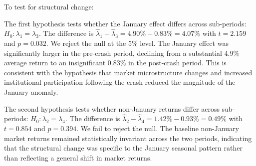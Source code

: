 \documentclass[11pt, a4paper]{article}
\begin{document}
To test for structural change:

The first hypothesis tests whether the January effect differs across sub-periods: \(H_0\colon \lambda_1 = \lambda_3\). The difference is \(\hat{\lambda}_1 - \hat{\lambda}_3 = 4.90\% - 0.83\% = 4.07\%\) with \(t = 2.159\) and \(p = 0.032\). We reject the null at the 5\% level. The January effect was significantly larger in the pre-crash period, declining from a substantial 4.9\% average return to an insignificant 0.83\% in the post-crash period. This is consistent with the hypothesis that market microstructure changes and increased institutional participation following the crash reduced the magnitude of the January anomaly.

The second hypothesis tests whether non-January returns differ across sub-periods: \(H_0\colon \lambda_2 = \lambda_4\). The difference is \(\hat{\lambda}_2 - \hat{\lambda}_4 = 1.42\% - 0.93\% = 0.49\%\) with \(t = 0.854\) and \(p = 0.394\). We fail to reject the null. The baseline non-January market returns remained statistically invariant across the two periods, indicating that the structural change was specific to the January seasonal pattern rather than reflecting a general shift in market returns.



\end{document}

